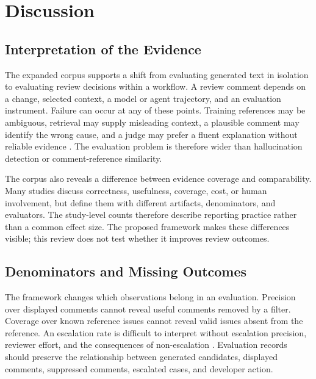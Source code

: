\documentclass[10pt]{article}
\begin{document}

\section{Discussion}

\subsection{Interpretation of the Evidence}

The expanded corpus supports a shift from evaluating generated text in isolation to evaluating review decisions within a workflow. A review comment depends on a change, selected context, a model or agent trajectory, and an evaluation instrument. Failure can occur at any of these points. Training references may be ambiguous, retrieval may supply misleading context, a plausible comment may identify the wrong cause, and a judge may prefer a fluent explanation without reliable evidence \cite{p08_liu2025_too_noisy,p31_jiang2025_codejudgebench,p93_meng2025_when_more_retrieval_hurts_retr,p101_jin2025_uncovering_systematic_failures}. The evaluation problem is therefore wider than hallucination detection or comment-reference similarity.

The corpus also reveals a difference between evidence coverage and comparability. Many studies discuss correctness, usefulness, coverage, cost, or human involvement, but define them with different artifacts, denominators, and evaluators. The study-level counts therefore describe reporting practice rather than a common effect size. The proposed framework makes these differences visible; this review does not test whether it improves review outcomes.

\subsection{Denominators and Missing Outcomes}

The framework changes which observations belong in an evaluation. Precision over displayed comments cannot reveal useful comments removed by a filter. Coverage over known reference issues cannot reveal valid issues absent from the reference. An escalation rate is difficult to interpret without escalation precision, reviewer effort, and the consequences of non-escalation \cite{p07_olewicki2024_revmate,p10_sun2025_bitsai_cr,p58_jin2026_reliable_code_reviewers}. Evaluation records should preserve the relationship between generated candidates, displayed comments, suppressed comments, escalated cases, and developer action.
\end{document}

